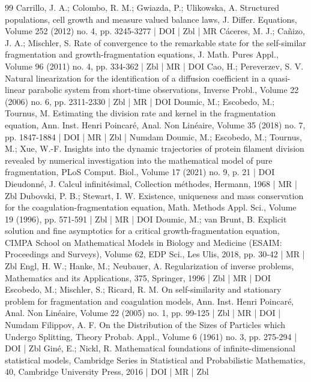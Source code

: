 \documentclass[10pt]{amsart}
\theoremstyle{definition}\newtheorem{defi}[theo]{Definition}\newtheorem{rema}[theo]{Remark}\newtheorem{exam}[theo]{Example}\newtheorem{exem}[theo]{Example}\newtheorem{nota}[theo]{Notation}
\begin{document}
\begin{thebibliography}{99}
Carrillo, J. A.; Colombo, R. M.; Gwiazda, P.; Ulikowska, A. Structured populations, cell growth and measure valued balance laws, J. Differ. Equations, Volume 252 (2012) no. 4, pp. 3245-3277 | DOI | Zbl | MR
Cáceres, M. J.; Cañizo, J. A.; Mischler, S. Rate of convergence to the remarkable state for the self-similar fragmentation and growth-fragmentation equations, J. Math. Pures Appl., Volume 96 (2011) no. 4, pp. 334-362 | Zbl | MR | DOI
Cao, H.; Pereverzev, S. V. Natural linearization for the identification of a diffusion coefficient in a quasi-linear parabolic system from short-time observations, Inverse Probl., Volume 22 (2006) no. 6, pp. 2311-2330 | Zbl | MR | DOI
Doumic, M.; Escobedo, M.; Tournus, M. Estimating the division rate and kernel in the fragmentation equation, Ann. Inst. Henri Poincaré, Anal. Non Linéaire, Volume 35 (2018) no. 7, pp. 1847-1884 | DOI | MR | Zbl | Numdam
Doumic, M.; Escobedo, M.; Tournus, M.; Xue, W.-F. Insights into the dynamic trajectories of protein filament division revealed by numerical investigation into the mathematical model of pure fragmentation, PLoS Comput. Biol., Volume 17 (2021) no. 9, p. 21 | DOI
Dieudonné, J. Calcul infinitésimal, Collection méthodes, Hermann, 1968 | MR | Zbl
Dubovski, P. B.; Stewart, I. W. Existence, uniqueness and mass conservation for the coagulation-fragmentation equation, Math. Methods Appl. Sci., Volume 19 (1996), pp. 571-591 | Zbl | MR | DOI
Doumic, M.; van Brunt, B. Explicit solution and fine asymptotics for a critical growth-fragmentation equation, CIMPA School on Mathematical Models in Biology and Medicine (ESAIM: Proceedings and Surveys), Volume 62, EDP Sci., Les Ulis, 2018, pp. 30-42 | MR | Zbl
Engl, H. W.; Hanke, M.; Neubauer, A. Regularization of inverse problems, Mathematics and its Applications, 375, Springer, 1996 | Zbl | MR | DOI
Escobedo, M.; Mischler, S.; Ricard, R. M. On self-similarity and stationary problem for fragmentation and coagulation models, Ann. Inst. Henri Poincaré, Anal. Non Linéaire, Volume 22 (2005) no. 1, pp. 99-125 | Zbl | MR | DOI | Numdam
Filippov, A. F. On the Distribution of the Sizes of Particles which Undergo Splitting, Theory Probab. Appl., Volume 6 (1961) no. 3, pp. 275-294 | DOI | Zbl
Giné, E.; Nickl, R. Mathematical foundations of infinite-dimensional statistical models, Cambridge Series in Statistical and Probabilistic Mathematics, 40, Cambridge University Press, 2016 | DOI | MR | Zbl

\end{thebibliography}
\end{document}
